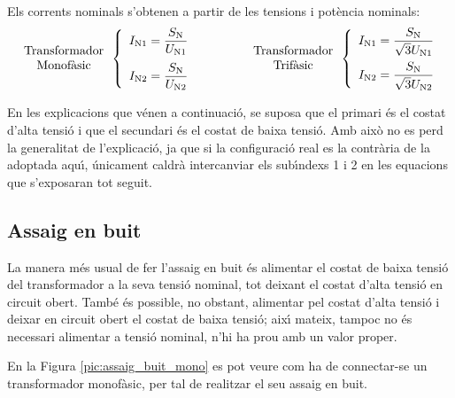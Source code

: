 Els corrents nominals s'obtenen a partir de les tensions i pot\`{e}ncia
nominals:
\begin{equation}
\begin{array}{c}\text{Transformador}\\
\text{Monof\`{a}sic}
\end{array} \left\{
\begin{array}{l}
   I_\mathrm{N1} = \dfrac{S_\mathrm{N}}{U_\mathrm{N1}} \\[2.7ex]
   I_\mathrm{N2} = \dfrac{S_\mathrm{N}}{U_\mathrm{N2}}
\end{array}
\right. \qquad\qquad
\begin{array}{c}\text{Transformador}\\
\text{Trif\`{a}sic}
\end{array} \left\{
\begin{array}{l}
   I_\mathrm{N1} = \dfrac{S_\mathrm{N}}{\sqrt{3}U_\mathrm{N1}} \\[2.5ex]
   I_\mathrm{N2} = \dfrac{S_\mathrm{N}}{\sqrt{3}U_\mathrm{N2}}
\end{array}
\right.
\end{equation}

En les explicacions que v\'{e}nen a continuaci\'{o}, se suposa que el
primari \'{e}s el costat d'alta tensi\'{o} i que el secundari \'{e}s el costat
de baixa tensi\'{o}. Amb aix\`{o} no es perd la generalitat de
l'explicaci\'{o}, ja que si la configuraci\'{o} real es la contr\`{a}ria de la
adoptada aqu\'{\i}, \'{u}nicament caldr\`{a} intercanviar els sub\'{\i}ndexs 1 i 2 en
les equacions que s'exposaran tot seguit.

\subsection{Assaig en buit}

La manera m\'{e}s usual de fer l'assaig en buit \'{e}s alimentar el costat
de baixa tensi\'{o} del transformador a  la seva tensi\'{o} nominal, tot
deixant el costat d'alta tensi\'{o} en circuit obert. Tamb\'{e} \'{e}s possible,
no obstant, alimentar pel costat d'alta tensi\'{o} i deixar en circuit
obert el costat de baixa tensi\'{o}; aix\'{\i} mateix, tampoc no \'{e}s necessari
alimentar a tensi\'{o} nominal, n'hi ha prou amb un valor proper.

En la Figura \vref{pic:assaig_buit_mono} es pot veure com ha de
connectar-se un transformador monof\`{a}sic, per tal de realitzar el seu
assaig en buit.

\begin{center}
    
    \label{pic:assaig_buit_mono}
\end{center}


